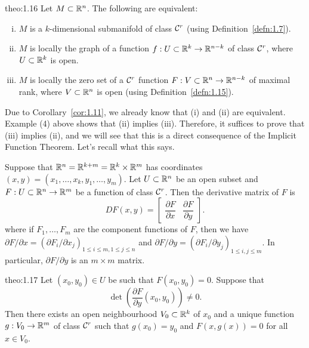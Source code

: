 \begin{theo}{theo:1.16}
    Let $M \subset \mathbb{R}^n$. The following are equivalent: 
    \begin{enumerate}[(i)]
        \item $M$ is a $k$-dimensional submanifold of class ${\cal C}^r$ (using Definition~\ref{defn:1.7}).
        \item $M$ is locally the graph of a function $f : U \subset \mathbb{R}^k \to \mathbb{R}^{n-k}$ 
        of class ${\cal C}^r$, where $U \subset \mathbb{R}^k$ is open. 
        \item $M$ is locally the zero set of a ${\cal C}^r$ function $F : V \subset \mathbb{R}^n 
        \to \mathbb{R}^{n-k}$ of maximal rank, where $V \subset \mathbb{R}^n$ is open 
        (using Definition~\ref{defn:1.15}).
    \end{enumerate}
\end{theo}\vspace{-0.25cm}

Due to Corollary~\ref{cor:1.11}, we already know that (i) and (ii) are 
equivalent. Example (4) above shows that (ii) implies (iii). Therefore, 
it suffices to prove that (iii) implies (ii), and we will see that this is a 
direct consequence of the Implicit Function Theorem. Let's recall what this says.

Suppose that $\mathbb{R}^n = \mathbb{R}^{k+m} = \mathbb{R}^k \times \mathbb{R}^m$ has coordinates $(x, y) 
= (x_1, \dots, x_k, y_1, \dots, y_m)$. Let $U \subset \mathbb{R}^n$ be an open subset 
and $F : U \subset \mathbb{R}^n \to \mathbb{R}^m$ be a function of class ${\cal C}^r$. Then the 
derivative matrix of $F$ is 
\[ DF(x, y) = \left[ \begin{array}{c|c} 
    \dfrac{\partial F}{\partial x} & \dfrac{\partial F}{\partial y} 
\end{array} \right]. \]
where if $F_1, \dots, F_m$ are the component functions of $F$, 
then we have $\partial F/\partial x = (\partial F_i/\partial x_j)_{1\leq i\leq m, 
1\leq j\leq n}$ and $\partial F/\partial y = 
(\partial F_i/\partial y_j)_{1\leq i, j\leq m}$. In particular, 
$\partial F/\partial y$ is an $m \times m$ matrix.

\begin{theo}{theo:1.17}
    Let $(x_0, y_0) \in U$ be such that $F(x_0, y_0) = 0$. Suppose that 
    \[ \det\left( \frac{\partial F}{\partial y}(x_0, y_0) \right) \neq 0. \] 
    Then there exists an open neighbourhood $V_0 \subset \mathbb{R}^k$ of $x_0$ 
    and a unique function $g : V_0 \to \mathbb{R}^m$ of class ${\cal C}^r$ such that 
    $g(x_0) = y_0$ and $F(x, g(x)) = 0$ for all $x \in V_0$. 
\end{theo}\vspace{-0.25cm}

